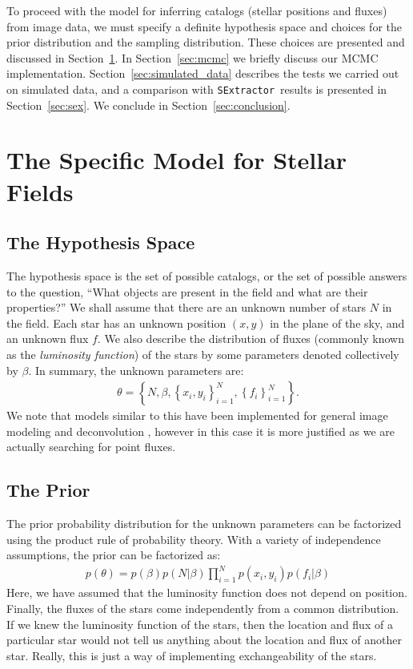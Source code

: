 \documentclass[manuscript]{aastex}
\newcommand{\sex}{{\tt SExtractor}}
\begin{document}
To proceed with the model for inferring catalogs (stellar positions and fluxes)
from image data, we must
specify a definite hypothesis space and choices for the prior distribution
and the sampling distribution. These choices are presented and discussed in
Section~\ref{sec:model}. In Section~\ref{sec:mcmc} we briefly discuss our
MCMC implementation. Section~\ref{sec:simulated_data} describes the tests we
carried out on simulated data, and a comparison with \sex~results is presented
in Section~\ref{sec:sex}. We conclude in Section~\ref{sec:conclusion}.

\section{The Specific Model for Stellar Fields}\label{sec:model}
\subsection{The Hypothesis Space}
The hypothesis space is the set of possible catalogs, or the set of possible
answers to the question, ``What objects are present in the field and
what are their properties?'' We shall assume that there are an unknown number of stars
$N$ in the field. Each star has an unknown
position $(x,y)$ in the plane of the sky, and an unknown flux $f$. We also
describe the distribution of fluxes (commonly known as the {\it luminosity
function}) of the stars by some parameters denoted collectively by $\beta$.
In summary, the unknown parameters are:
\begin{eqnarray}
\theta = \left\{N, \beta, \left\{x_i, y_i\right\}_{i=1}^N,
\left\{f_i\right\}_{i=1}^N\right\}.
\end{eqnarray}
We note that models similar to this have been implemented for general image
modeling and deconvolution \citep[e.g.][]{massinf}, however in this case it is
more justified as we are actually searching for point fluxes.

\subsection{The Prior}
The prior probability distribution for the unknown parameters can be factorized
using the product rule of probability theory.
With a variety of independence assumptions, the prior
can be factorized as:
\begin{eqnarray}
p(\theta) = p(\beta)p(N|\beta)\prod_{i=1}^N p(x_i, y_i)
p(f_i | \beta)
\end{eqnarray}
Here, we have assumed that the luminosity function does not depend on position.
Finally, the fluxes of the stars come independently from
a common distribution. If we knew the luminosity
function of the stars, then the location and flux of a particular star would
not tell us anything about the location and flux of another star. Really, this
is just a way of implementing exchangeability of the stars.
\end{document}
